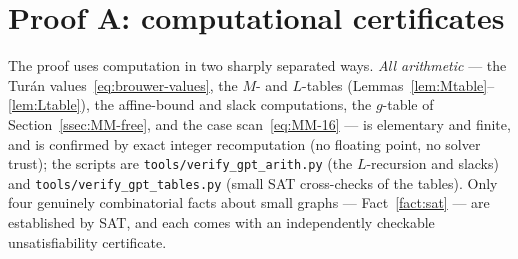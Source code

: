 \documentclass[11pt,reqno]{amsart}
\theoremstyle{definition}
\theoremstyle{remark}
\begin{document}
\section{Proof A: computational certificates}\label{sec:certificates}

The proof uses computation in two sharply separated ways. \emph{All arithmetic}
--- the Tur\'an values~\eqref{eq:brouwer-values}, the $M$- and $L$-tables
(Lemmas~\ref{lem:Mtable}--\ref{lem:Ltable}), the affine-bound and slack
computations, the $g$-table of Section~\ref{ssec:MM-free}, and the case
scan~\eqref{eq:MM-16} --- is elementary and finite, and is confirmed by exact
integer recomputation (no floating point, no solver trust); the scripts are
\texttt{tools/verify\_gpt\_arith.py} (the $L$-recursion and slacks) and
\texttt{tools/verify\_gpt\_tables.py} (small SAT cross-checks of the tables). Only
four genuinely combinatorial facts about small graphs --- Fact~\ref{fact:sat} ---
are established by SAT, and each comes with an independently checkable
unsatisfiability certificate.
\end{document}
